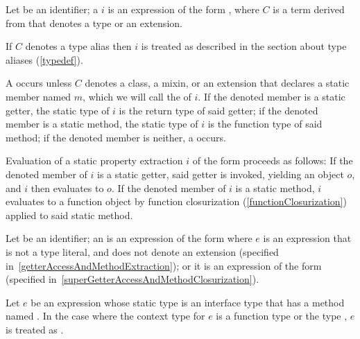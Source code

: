 \documentclass[makeidx]{article}
\begin{document}
{\LMHash{}%
Let \id{} be an identifier;
a 
$i$ is an expression of the form ,
where $C$ is a term derived from  that denotes
a type or an extension.

\LMHash{}%
If $C$ denotes a type alias then $i$ is treated as described
in the section about type aliases
(\ref{typedef}).

\LMHash{}%
A  occurs
unless $C$ denotes a class, a mixin, or an extension that declares
a static member named $m$,
which we will call the
of $i$.
If the denoted member is a static getter,
the static type of $i$ is the return type of said getter;
if the denoted member is a static method,
the static type of $i$ is the function type of said method;
if the denoted member is neither, a  occurs.

\LMHash{}%
Evaluation of a static property extraction $i$ of the form 
proceeds as follows:
If the denoted member of $i$ is a static getter,
said getter is invoked, yielding an object $o$,
and $i$ then evaluates to $o$.
If the denoted member of $i$ is a static method,
$i$ evaluates to a function object by function closurization
(\ref{functionClosurization})
applied to said static method.
\EndCase

\LMHash{}%
Let \id{} be an identifier;
an 
is an expression of the form 
where $e$ is an expression that is not a type literal,
and does not denote an extension
(specified in~\ref{getterAccessAndMethodExtraction});
or it is an expression of the form 
(specified in~\ref{superGetterAccessAndMethodClosurization}).
\EndCase

\LMHash{}%
Let $e$ be an expression whose static type is
an interface type that has a method named \CALL.
In the case where the context type for $e$ is a function type
or the type \FUNCTION,
$e$ is treated as .

\EndCase


}
\end{document}
